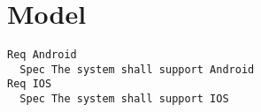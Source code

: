 \chapter{Model}


\begin{lstlisting}
Req Android
  Spec The system shall support Android
Req IOS
  Spec The system shall support IOS

\end{lstlisting}